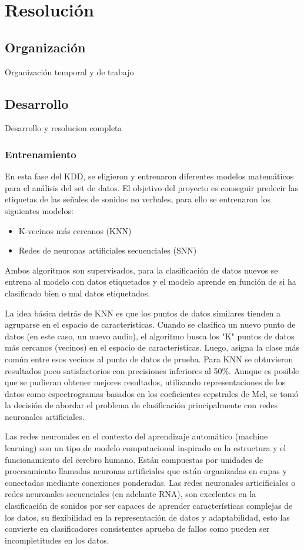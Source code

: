 
\section{Resolución}
\subsection{Organización}
Organización temporal y de trabajo

\subsection{Desarrollo}
Desarrollo y resolucion completa

\subsubsection{Entrenamiento}
En esta fase del KDD, se eligieron y entrenaron diferentes modelos matemáticos para el análisis del set de datos. El objetivo del proyecto es conseguir predecir las etiquetas de las señales de sonidos no verbales, para ello se entrenaron los siguientes modelos:
\begin{itemize}
    \item K-vecinos más cercanos (KNN)
    \item Redes de neuronas artificiales secuenciales (SNN)
\end{itemize}
Ambos algoritmos son supervisados, para la clasificación de datos nuevos se entrena al modelo con datos etiquetados y el modelo aprende en función de si ha clasificado bien o mal datos etiquetados.

La idea básica detrás de KNN es que los puntos de datos similares tienden a agruparse en el espacio de características. Cuando se clasifica un nuevo punto de datos (en este caso, un nuevo audio), el algoritmo busca los "K" puntos de datos más cercanos (vecinos) en el espacio de características. Luego, asigna la clase más común entre esos vecinos al punto de datos de prueba. Para KNN se obtuvieron resultados poco satisfactorios con precisiones inferiores al 50\%. Aunque es posible que se pudieran obtener mejores resultados, utilizando representaciones de los datos como espectrogramas basados en los coeficientes cepstrales de Mel, se tomó la decisión de abordar el problema de clasificación principalmente con redes neuronales artificiales.

Las redes neuronales en el contexto del aprendizaje automático (machine learning) son un tipo de modelo computacional inspirado en la estructura y el funcionamiento del cerebro humano. Están compuestas por unidades de procesamiento llamadas neuronas artificiales que están organizadas en capas y conectadas mediante conexiones ponderadas. Las redes neuronales articificiales o redes neuronales secuenciales (en adelante RNA), son excelentes en la clasificación de sonidos por ser capaces de aprender características complejas de los datos, su flexibilidad en la representación de datos y adaptabilidad, esto las convierte en clasificadores consistentes aprueba de fallos como pueden ser incompletitudes en los datos.

